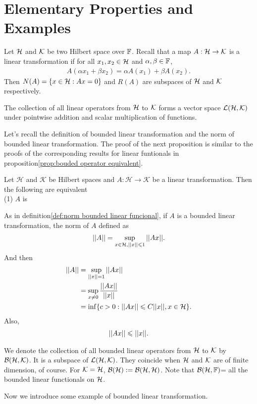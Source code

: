 \chapter{Elementary Properties and Examples}\label{chp:2_1}


Let $\mathcal{H}$ and $\mathcal{K}$ be two Hilbert space over $\mathbb{F}$. Recall that a map $A:\mathcal{H}\rightarrow \mathcal{K}$ is a linear transformation if for all $x_1,x_2\in \mathcal{H}$ and $\alpha,\beta\in \mathbb{F}$,
\begin{align*}
    A(\alpha x_1+\beta x_2) = \alpha A(x_1)+\beta A(x_2).
\end{align*}
Then $N(A)=\{x\in\mathcal{H}: Ax=0\}$ and $R(A)$ are subspaces of $\mathcal{H}$ and $\mathcal{K}$ respectively. 

The collection of all linear operators from $\mathcal{H}$ to $\mathcal{K}$ forms a vector space $\mathcal{L}(\mathcal{H}, \mathcal{K})$ under pointwise
addition and scalar multiplication of functions.

Let's recall the definition of bounded linear transformation and the norm of bounded linear transformation. The proof of the next proposition is similar to the proofs of the corresponding results for linear funtionals in proposition\ref{prop:bouded operator equivalent}. 

\begin{proposition}{}{}
    Let $\mathcal{H}$ and $\mathcal{K}$ be Hilbert spaces and $A:\mathcal{H}\rightarrow \mathcal{K}$ be a linear transformation. Then the following are equivalent\\
    (1) $A$ is 
\end{proposition}

As in definition\ref{def:norm bounded linear funcional}, if $A$ is a bounded linear transformation, the norm of $A$ defined as
\begin{align*}
    ||A||=\sup_{x\in \mathcal{H},||x||\leqslant 1}||Ax||.
\end{align*}
And then
\begin{align*}
    ||A||&=\sup_{||x||=1}||Ax||\\
        &= \sup_{x\neq 0} \frac{||Ax||}{||x||}\\
        &= \inf\{c>0:||Ax||\leqslant C||x||,x\in \mathcal{H}\}.
\end{align*}
Also, 
\begin{align*}
    ||Ax||\leqslant ||x||. 
\end{align*}

We denote the collection of all bounded linear operators from $\mathcal{H}$ to $\mathcal{K}$ by $\mathcal{B}(\mathcal{H}, \mathcal{K})$. It is a subspace
of $\mathcal{L}(\mathcal{H}, \mathcal{K})$. They coincide when $\mathcal{H}$ and $\mathcal{K}$ are of finite dimension, of course.
For $\mathcal{K}=\mathcal{H}$, $\mathcal{B}(\mathcal{H}):=\mathcal{B}(\mathcal{H},\mathcal{H})$. Note that $\mathcal{B}(\mathcal{H},\mathbb{F})$= all the bounded linear functionals on $\mathcal{H}$.

Now we introduce some example of bounded linear transformation.